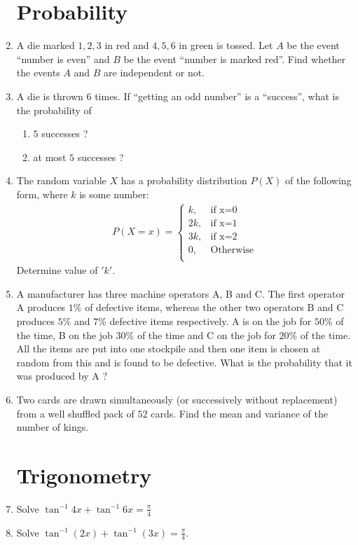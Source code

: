\documentclass{article}
\begin{document}
\begin{enumerate}
\section{Probability}
\item A die marked $ 1, 2, 3$ in red and $4, 5, 6$ in green is tossed. Let $A$ be the event “number is even” and $B$ be the event “number is marked red”. Find whether the events $A$ and $B$ are independent or not.
\item A die is thrown $6$ times. If “getting an odd number” is a “success”, what is the probability of 
\begin{enumerate}
    \item $5$ successes ?
    \item at most $5$ successes ? 
\end{enumerate} 
\item The random variable $X$ has a probability distribution $P(X)$ of the following form, where $k$ is some number:
\begin{align*}
P(X = x) = 
\begin{cases}
    k , & \text{if x=0} \\
    2k , & \text{if x=1} \\
    3k , & \text{if x=2} \\
    0 , & \text{Otherwise} \\      
\end{cases}
\end{align*}
 Determine value of $'k'$.
 \item A manufacturer has three machine operators A, B and C. The first operator A produces $1\%$ of defective items, whereas the other two operators B and C produces $5\%$ and $7\%$ defective items respectively. A is on the job for $50\%$ of the time, B on the job $30\%$ of the time and C on the job for $20\%$ of the time. All the items are put into one stockpile and then one item is chosen at random from this and is found to be defective. What is the probability that it was produced by A ?
\item Two cards are drawn simultaneously (or successively without replacement) from a well shuffled pack of $52$ cards. Find the mean and variance of the number of kings.
\section{Trigonometry}
\item Solve ${\tan^{-1}4x}+{\tan^{-1}6x} = \frac{\pi}{4}$
\item Solve ${\tan^{-1}(2x)}+{\tan^{-1}(3x)} = \frac{\pi}{4}$.

\end{enumerate}
\end{document}
